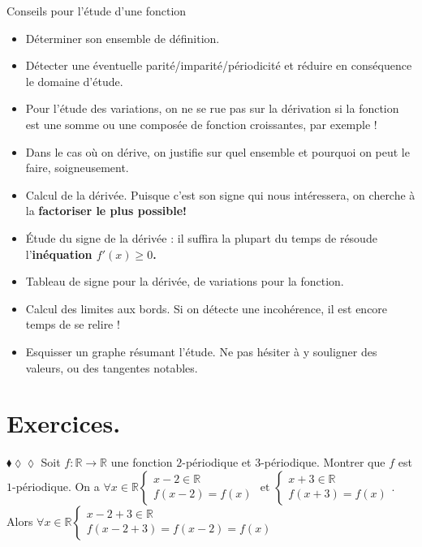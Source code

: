 \documentclass[11pt]{article}
\begin{document}
\begin{meth}{Conseils pour l'étude d'une fonction}{}
    \begin{itemize}
        \item Déterminer son ensemble de définition.
        \item Détecter une éventuelle parité/imparité/périodicité et réduire en conséquence le domaine d'étude.
        \item Pour l'étude des variations, on ne se rue pas sur la dérivation si la fonction est une somme ou une composée de fonction croissantes, par exemple !
        \item Dans le cas où on dérive, on justifie sur quel ensemble et pourquoi on peut le faire, soigneusement.
        \item Calcul de la dérivée. Puisque c'est son signe qui nous intéressera, on cherche à la \bf{factoriser} le plus possible!
        \item Étude du signe de la dérivée : il suffira la plupart du temps de résoude l'\bf{inéquation} $f'(x)\geq0$.
        \item Tableau de signe pour la dérivée, de variations pour la fonction.
        \item Calcul des limites aux bords. Si on détecte une incohérence, il est encore temps de se relire !
        \item Esquisser un graphe résumant l'étude. Ne pas hésiter à y souligner des valeurs, ou des tangentes notables.
    \end{itemize}
\end{meth}

\section{Exercices.}

\begin{exercice}{$\blacklozenge\lozenge\lozenge$}{}
    Soit $f:\mathbb{R}\rightarrow\mathbb{R}$ une fonction $2$-périodique et $3$-périodique. Montrer que $f$ est $1$-périodique.
    \tcblower
    On a $\forall{x\in\mathbb{R}}\begin{cases}x-2\in\mathbb{R}\\f(x-2)=f(x)\end{cases} \text{ et } \begin{cases}x+3\in\mathbb{R}\\f(x+3)=f(x)\end{cases}$.\\
    Alors $\forall{x\in\mathbb{R}}\begin{cases}x-2+3\in\mathbb{R}\\f(x-2+3)=f(x-2)=f(x)\end{cases}$
\end{exercice}
\end{document}
